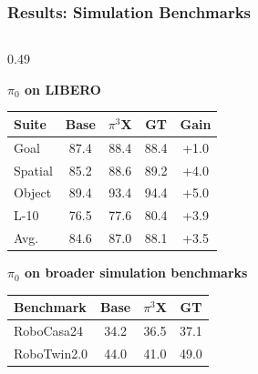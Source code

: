 \documentclass[aspectratio=169,11pt]{beamer}
\begin{document}
\begin{frame}
  \frametitle{Results: Simulation Benchmarks}

  \vspace{-0.05cm}

  \begin{columns}[T,onlytextwidth]

    \begin{column}{0.49\textwidth}

      \textbf{\small $\pi_0$ on LIBERO}

      \vspace{0.06cm}

      \begin{table}
      \centering
      \scriptsize
      \renewcommand{\arraystretch}{1.12}
      \begin{tabular}{lcccc}
        \toprule
        \textbf{Suite} & \textbf{Base} & \textbf{$\pi^3$X} & \textbf{GT} & \textbf{Gain} \\
        \midrule
        Goal    & 87.4 & 88.4 & 88.4 & +1.0 \\
        Spatial & 85.2 & 88.6 & 89.2 & +4.0 \\
        Object  & 89.4 & 93.4 & 94.4 & +5.0 \\
        L-10    & 76.5 & 77.6 & 80.4 & +3.9 \\
        Avg.    & 84.6 & 87.0 & 88.1 & +3.5 \\
        \bottomrule
      \end{tabular}
      \end{table}

      \vspace{0.18cm}

      \textbf{\small $\pi_0$ on broader simulation benchmarks}

      \vspace{0.06cm}

      \begin{table}
      \centering
      \scriptsize
      \renewcommand{\arraystretch}{1.12}
      \begin{tabular}{lccc}
        \toprule
        \textbf{Benchmark} & \textbf{Base} & \textbf{$\pi^3$X} & \textbf{GT} \\
        \midrule
        RoboCasa24  & 34.2 & 36.5 & 37.1 \\
        RoboTwin2.0 & 44.0 & 41.0 & 49.0 \\
        \bottomrule
      \end{tabular}
      \end{table}


\end{column}
\end{columns}
\end{frame}
\end{document}
